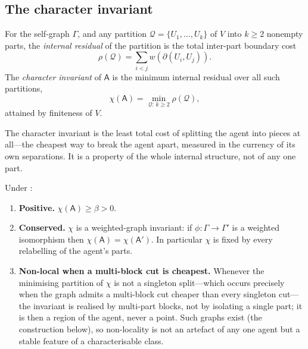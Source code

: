 \documentclass[11pt,twocolumn,a4paper]{article}
\newcommand{\Agent}{\mathsf{A}}
\newcommand{\Self}{\Gamma}          %
\newcommand{\V}{V}
\newcommand{\wt}{w}
\newcommand{\floorc}{\beta}          %
\newcommand{\cut}{\partial}
\newcommand{\Char}{\chi}             %
\begin{document}
\subsection{The character invariant}

\begin{definition}
\label{def:char}
For the self-graph $\Self$, and any partition
$\mathcal{Q}=\{U_1,\dots,U_k\}$ of $\V$ into $k\ge2$ nonempty parts, the
\emph{internal residual} of the partition is the total inter-part
boundary cost
\[
\rho(\mathcal{Q})=\sum_{i<j}\wt(\cut(U_i,U_j)).
\]
The \emph{character invariant} of $\Agent$ is the minimum internal
residual over all such partitions,
\[
\Char(\Agent)=\min_{\mathcal{Q}:\,k\ge2}\rho(\mathcal{Q}),
\]
attained by finiteness of $\V$.
\end{definition}

The character invariant is the least total cost of splitting the agent
into pieces at all---the cheapest way to break the agent apart, measured
in the currency of its own separations. It is a property of the whole
internal structure, not of any one part.

\begin{theorem}
\label{thm:identity}
Under :
\begin{enumerate}[label=\textup{(\roman*)},leftmargin=2.2em]
\item \textbf{Positive.} $\Char(\Agent)\ge\floorc>0$.
\item \textbf{Conserved.} $\Char$ is a weighted-graph invariant: if
$\phi:\Self\to\Self'$ is a weighted isomorphism then
$\Char(\Agent)=\Char(\Agent')$. In particular $\Char$ is fixed by every
relabelling of the agent's parts.
\item \textbf{Non-local when a multi-block cut is cheapest.} Whenever the
minimising partition of $\Char$ is not a singleton split---which occurs
precisely when the graph admits a multi-block cut cheaper than every
singleton cut---the invariant is realised by multi-part blocks, not by
isolating a single part; it is then a region of the agent, never a point.
Such graphs exist (the construction below), so non-locality is not an
artefact of any one agent but a stable feature of a characterisable class.
\end{enumerate}
\end{theorem}
\end{document}
